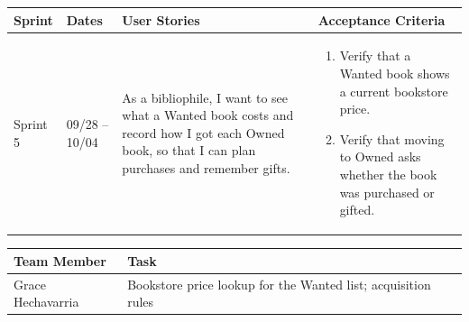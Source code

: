 \documentclass[12pt]{article}
\begin{document}
\noindent\begin{minipage}{\linewidth}

\vspace{0.5em}
\noindent
\begin{tabular}{|L{1.2cm}|L{1.8cm}|L{5.2cm}|L{6.3cm}|}
\hline
\textbf{Sprint} & \textbf{Dates} & \textbf{User Stories} & \textbf{Acceptance Criteria} \\
\hline
Sprint 5 & 09/28 -- 10/04 &
As a bibliophile, I want to see what a Wanted book costs and record how I got each Owned book, so that I can plan purchases and remember gifts. &
\begin{enumerate}
    \item Verify that a Wanted book shows a current bookstore price.
    \item Verify that moving to Owned asks whether the book was purchased or gifted.
\end{enumerate} \\
\hline
\end{tabular}

\vspace{0.5em}
\noindent
\begin{tabular}{|L{3.4cm}|L{11.6cm}|}
\hline
\textbf{Team Member} & \textbf{Task} \\
\hline
Grace Hechavarria & Bookstore price lookup for the Wanted list; acquisition rules \\
\hline
\end{tabular}
\end{minipage}

\vspace{1.5em}
\end{document}
